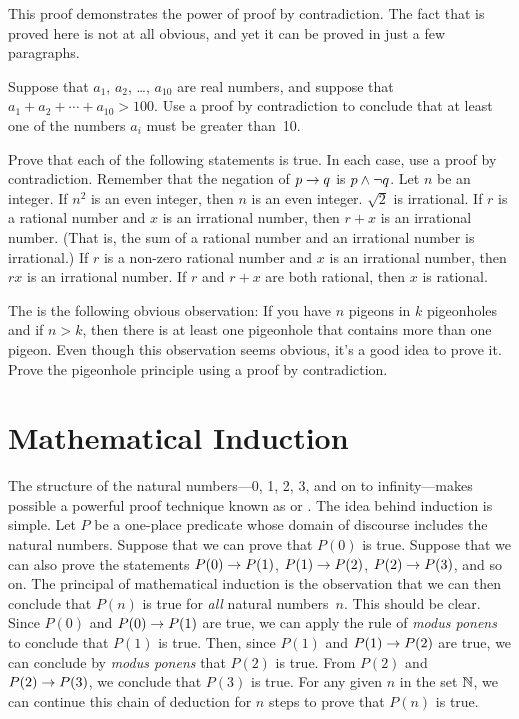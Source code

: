 This proof demonstrates the power of proof by contradiction.
The fact that is proved here is not at all obvious, and yet it can
be proved in just a few paragraphs.



\begin{exercises}

\problem Suppose that $a_1$, $a_2$, \dots, $a_{10}$ are real numbers,
and suppose that $a_1+a_2+\cdots+a_{10}>100$.  Use a proof by contradiction
to conclude that at least one of the numbers $a_i$ must be greater than~10.


\problem Prove that each of the following statements is true. 
In each case, use a proof by contradiction.  Remember that the
negation of $p\rightarrow q$ is $p \wedge \lnot q$.
\ppart Let $n$ be an integer.  If $n^2$ is an even integer, then 
$n$ is an even integer.  
\ppart $\sqrt{2}$ is irrational.
\ppart If $r$ is a rational number and $x$ is an
irrational number, then $r+x$ is an irrational number. (That is, the
sum of a rational number and an irrational number is irrational.)
\ppart If $r$ is a non-zero rational number and $x$ is an
irrational number, then $rx$ is an irrational number.    
\ppart If $r$ and $r+x$ are both rational, then $x$ is rational.

\problem The  is the following obvious
observation:  If you have $n$ pigeons in $k$ pigeonholes and if $n>k$,
then there is at least one pigeonhole that contains more than
one pigeon.  Even though this observation seems obvious, it's a
good idea to prove it.  Prove the pigeonhole principle using a
proof by contradiction.

\end{exercises}




\section{Mathematical Induction}


The structure of the natural numbers---0, 1, 2, 3, and on to infinity---makes 
possible a powerful proof technique known as  or .
The idea behind induction is simple.  Let $P$ be a one-place predicate
whose domain of discourse includes the natural numbers.  Suppose that
we can prove that $P(0)$ is true.  Suppose that we can also prove
the statements $P(0)\rightarrow P(1)$, $P(1)\rightarrow P(2)$, $P(2)\rightarrow P(3)$,
and so on.  The principal of mathematical induction is the observation
that we can then conclude that $P(n)$ is true for \textit{all} natural
numbers~$n$.
This should be clear.  Since $P(0)$ and $P(0)\rightarrow P(1)$ are true,
we can apply the rule of \textit{modus ponens} to conclude that $P(1)$
is true.  Then, since $P(1)$ and $P(1)\rightarrow P(2)$ are true, we can
conclude by \textit{modus ponens} that $P(2)$ is true.  From $P(2)$
and $P(2)\rightarrow P(3)$, we conclude that $P(3)$ is true.  For any
given $n$ in the set ${\mathbb N}$, we can continue this chain of deduction for $n$ steps
to prove that $P(n)$ is true.

